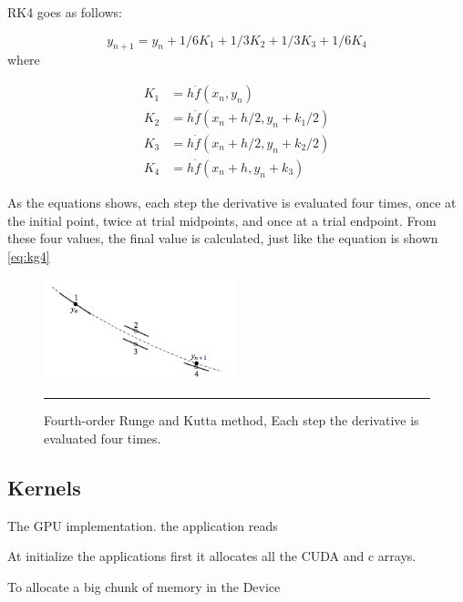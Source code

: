 RK4 goes as follows:

\begin{equation} \label{eq:kg4}
y_{n+1} = y_{n} + 1/6 K_{1} + 1/3 K_{2} +1/3 K_{3} + 1/6 K_{4} 
\end{equation}
where

\begin{align*}
K_{1} &= h \dot f(x_{n}, y_{n}) \\
K_{2} &= h \dot f(x_{n} + h/2, y_{n} + k_{1}/2) \\
K_{3} &= h \dot f(x_{n} + h/2, y_{n} + k_{2}/2) \\
K_{4} &= h \dot f(x_{n} + h, y_{n} + k_{3})
\end{align*}

As the equations shows, each step the derivative is evaluated four times, once at the initial point, twice at trial midpoints, and once at a trial endpoint. From these four values, the final value is calculated, just like the equation is shown \ref{eq:kg4}

\begin{figure}[htbp]
	\centering
		\includegraphics[width=0.5\textwidth]{Figures/rk4.png}
		\rule{35em}{0.5pt}
	\caption[Fourth-order Runge and Kutta Method]{Fourth-order Runge and Kutta method, Each step the derivative is evaluated four times. }
	\label{fig:kutta}
\end{figure}

\cite{numerical}




\subsection{Kernels}

The GPU implementation. the application reads

At initialize the applications first it allocates all the CUDA and c arrays.

To allocate a big chunk of memory in the Device 

